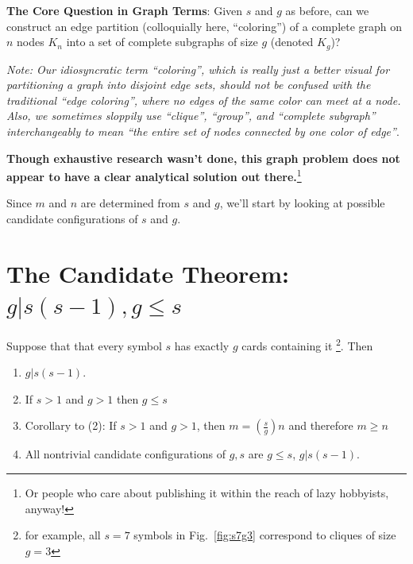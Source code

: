 \documentclass[11pt, oneside]{article} 	%
\begin{document}
\begin{framed}
\textbf{The Core Question in Graph Terms}: Given $s$ and $g$ as before, can we construct an edge partition (colloquially here, ``coloring'') of a complete graph on $n$ nodes $K_n$ into a set of complete subgraphs of size $g$ (denoted $K_g$)?
\end{framed}

\emph{Note: Our idiosyncratic term ``coloring'', which is really just a better visual for partitioning a graph into disjoint edge sets, should not be confused with the traditional ``edge coloring'', where no edges of the same color can meet at a node. Also, we sometimes sloppily use ``clique'', ``group'', and ``complete subgraph'' interchangeably to mean ``the entire set of nodes connected by one color of edge''}.

\textbf{Though exhaustive research wasn't done, this graph problem does not appear to have a clear analytical solution out there.}\footnote{Or people who care about publishing it within the reach of lazy hobbyists, anyway!}

Since $m$ and $n$ are determined from $s$ and $g$, we'll start by looking at possible candidate configurations of $s$ and $g$.

\section{The Candidate Theorem: $g | s(s-1), g \leq s$}

Suppose that that every symbol $s$ has exactly $g$ cards containing it \footnote{for example, all $s=7$ symbols in Fig.~\ref{fig:s7g3} correspond to cliques of size $g=3$}. Then 

\begin{framed}
\begin{enumerate}
\item $g | s(s-1)$.
\item If $s >1 $ and $g > 1$ then $g \leq s$ 
\item Corollary to (2): If $s >1 $ and $g > 1$, then $m = (\frac{s}{g})n$ and therefore $m \geq n$
\item All nontrivial candidate configurations of $g, s$ are $g \leq s$, $g | s(s-1)$.
\end{enumerate}
\end{framed}
\end{document}
